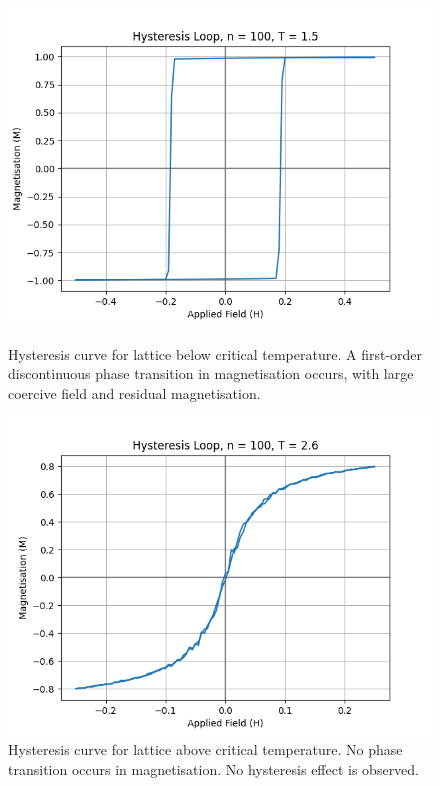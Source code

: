 \documentclass[a4paper, 12pt]{article}
\begin{document}
\begin{figure}[H]
  \begin{minipage}[t]{0.5\textwidth}
    \captionsetup{width=.8\linewidth}
    \includegraphics[width=\textwidth]{./resources/hysteresis_T1.5.png}
    \caption{Hysteresis curve for lattice below critical temperature. A first-order discontinuous phase transition in magnetisation occurs, with large coercive field and residual magnetisation.}
  \end{minipage}
  \hfill
  \begin{minipage}[t]{0.5\textwidth}
    \captionsetup{width=.8\linewidth}
    \includegraphics[width=\textwidth]{./resources/hysteresis_T2.6.png}
    \caption{Hysteresis curve for lattice above critical temperature. No phase transition occurs in magnetisation. No hysteresis effect is observed.}
  \end{minipage}
\end{figure}
\end{document}
